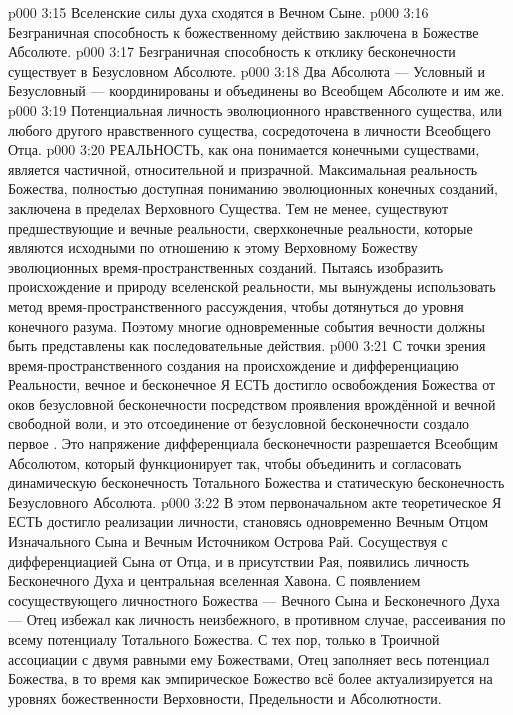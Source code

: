 \vs p000 3:15 Вселенские силы духа сходятся в Вечном Сыне.
\vs p000 3:16 Безграничная способность к божественному действию заключена в Божестве Абсолюте.
\vs p000 3:17 Безграничная способность к отклику бесконечности существует в Безусловном Абсолюте.
\vs p000 3:18 Два Абсолюта --- Условный и Безусловный --- координированы и объединены во Всеобщем Абсолюте и им же.
\vs p000 3:19 Потенциальная личность эволюционного нравственного существа, или любого другого нравственного существа, сосредоточена в личности Всеобщего Отца.
\vs p000 3:20 \pc РЕАЛЬНОСТЬ, как она понимается конечными существами, является частичной, относительной и призрачной. Максимальная реальность Божества, полностью доступная пониманию эволюционных конечных созданий, заключена в пределах Верховного Существа. Тем не менее, существуют предшествующие и вечные реальности, сверхконечные реальности, которые являются исходными по отношению к этому Верховному Божеству эволюционных время\hyp{}пространственных созданий. Пытаясь изобразить происхождение и природу вселенской реальности, мы вынуждены использовать метод время\hyp{}пространственного рассуждения, чтобы дотянуться до уровня конечного разума. Поэтому многие одновременные события вечности должны быть представлены как последовательные действия.
\vs p000 3:21 С точки зрения время\hyp{}пространственного создания на происхождение и дифференциацию Реальности, вечное и бесконечное Я ЕСТЬ достигло освобождения Божества от оков безусловной бесконечности посредством проявления врождённой и вечной свободной воли, и это отсоединение от безусловной бесконечности создало первое . Это напряжение дифференциала бесконечности разрешается Всеобщим Абсолютом, который функционирует так, чтобы объединить и согласовать динамическую бесконечность Тотального Божества и статическую бесконечность Безусловного Абсолюта.
\vs p000 3:22 В этом первоначальном акте теоретическое Я ЕСТЬ достигло реализации личности, становясь одновременно Вечным Отцом Изначального Сына и Вечным Источником Острова Рай. Сосуществуя с дифференциацией Сына от Отца, и в присутствии Рая, появились личность Бесконечного Духа и центральная вселенная Хавона. С появлением сосуществующего личностного Божества --- Вечного Сына и Бесконечного Духа --- Отец избежал как личность неизбежного, в противном случае, рассеивания по всему потенциалу Тотального Божества. С тех пор, только в Троичной ассоциации с двумя равными ему Божествами, Отец заполняет весь потенциал Божества, в то время как эмпирическое Божество всё более актуализируется на уровнях божественности Верховности, Предельности и Абсолютности.
